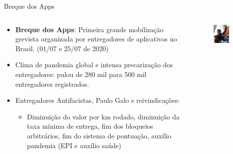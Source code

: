 \documentclass{beamer}
\begin{document}
\begin{frame}{Breque dos Apps}
    \begin{columns}
        \begin{column}{0.7\textwidth}
            \begin{itemize}
                \item \textbf{Breque dos Apps}: Primeira grande mobilização grevista organizada por entregadores de aplicativos no Brasil. (01/07 e 25/07 de 2020)
                \item Clima de pandemia global e intensa precarização dos entregadores: pulou de 280 mil para 500 mil entregadores registrados.
                \item Entregadores Antifacistas, Paulo Galo e reivindicações:
                \begin{itemize}
                    \item Diminuição do valor por km rodado, diminuição da taxa mínima de entrega, fim dos bloqueios arbitrários, fim do sistema de pontuação, auxílio pandemia (EPI e auxílio saúde)
                \end{itemize}
            \end{itemize}
        \end{column}
        \begin{column}{0.3\textwidth}
            \begin{figure}
                \centering
                \includegraphics[width=1\linewidth]{img/Paulo_lima_galo.jpg}
            \end{figure}
        \end{column}
    \end{columns}
\end{frame}
\end{document}

